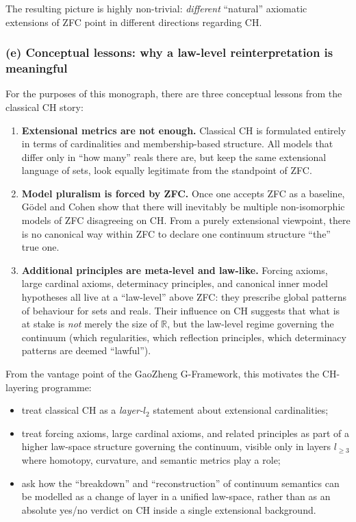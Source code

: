 \documentclass[11pt]{book}
\theoremstyle{plain}
\theoremstyle{definition}
\begin{document}
The resulting picture is highly non-trivial: \emph{different} “natural”
axiomatic extensions of ZFC point in different directions regarding CH.



\subsubsection*{(e) Conceptual lessons: why a law-level reinterpretation is meaningful}

For the purposes of this monograph, there are three conceptual lessons
from the classical CH story:

\begin{enumerate}[label=\arabic*)]
  \item \textbf{Extensional metrics are not enough.}
        Classical CH is formulated entirely in terms of cardinalities
        and membership-based structure. All models that differ only in
        “how many” reals there are, but keep the same extensional
        language of sets, look equally legitimate from the standpoint
        of ZFC.
  \item \textbf{Model pluralism is forced by ZFC.}
        Once one accepts ZFC as a baseline, Gödel and Cohen show that
        there will inevitably be multiple non-isomorphic models of ZFC
        disagreeing on CH. From a purely extensional viewpoint, there
        is no canonical way within ZFC to declare one continuum
        structure “the” true one.
  \item \textbf{Additional principles are meta-level and law-like.}
        Forcing axioms, large cardinal axioms, determinacy principles,
        and canonical inner model hypotheses all live at a “law-level”
        above ZFC: they prescribe global patterns of behaviour for
        sets and reals. Their influence on CH suggests that what is at
        stake is \emph{not} merely the size of $\mathbb{R}$, but the
        law-level regime governing the continuum (which regularities,
        which reflection principles, which determinacy patterns are
        deemed “lawful”).
\end{enumerate}

From the vantage point of the GaoZheng G-Framework, this motivates the
CH-layering programme:

\begin{itemize}
  \item treat classical CH as a \emph{layer-$l_2$} statement about
        extensional cardinalities;
  \item treat forcing axioms, large cardinal axioms, and related
        principles as part of a higher law-space structure governing
        the continuum, visible only in layers $l_{\ge3}$ where
        homotopy, curvature, and semantic metrics play a role;
  \item ask how the “breakdown” and “reconstruction” of continuum
        semantics can be modelled as a change of layer in a unified
        law-space, rather than as an absolute yes/no verdict on CH
        inside a single extensional background.
\end{itemize}
\end{document}
